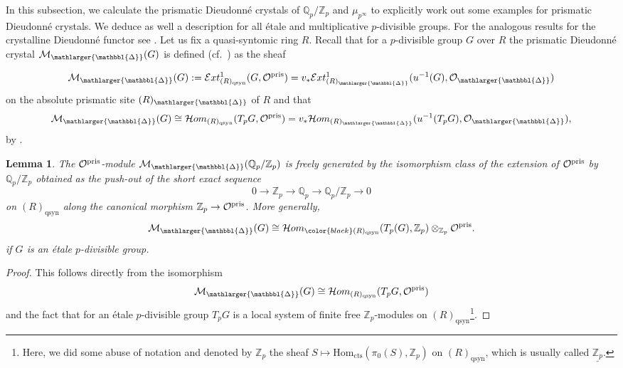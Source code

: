 \documentclass{amsart}
\newcommand{\prism}{{\mathlarger{\mathbbl{\Delta}}}}
\theoremstyle{plain}
\newtheorem{lemma}[theorem]{Lemma}
\theoremstyle{definition}
\newcommand{\Q}{\mathbb{Q}}
\newcommand{\Z}{\mathbb{Z}}
\newcommand{\red}[1]{{\color{black} #1}}
\begin{document}
In this subsection, we calculate the prismatic Dieudonn\'e crystals of $\Q_p/\Z_p$ and $\mu_{p^\infty}$ to explicitly work out some examples for prismatic Dieudonn\'e crystals. We deduce as well a description for all \'etale and multiplicative $p$-divisible groups.
For the analogous results for the crystalline Dieudonn\'e functor see \cite[2.2]{berthelot_messing_theorie_de_dieudonne_cristalline_III}.
Let us fix a quasi-syntomic ring $R$.
Recall that for a $p$-divisible group $G$ over $R$ the prismatic Dieudonn\'e crystal $\mathcal{M}_\prism(G)$ is defined (cf.\ ) as the sheaf

$$
\mathcal{M}_{\prism}(G):=\mathcal{E}xt_{(R)_{\mathrm{qsyn}}}^1(G,\mathcal{O}^{\rm pris}) = v_*\mathcal{E}xt_{(R)_{\prism}}^{1}(u^{-1}(G),\mathcal{O}_\prism)
$$
on the absolute prismatic site $(R)_\prism$ of $R$ and that
$$
\mathcal{M}_\prism(G)\cong \mathcal{H}om_{(R)_{\mathrm{qsyn}}}(T_pG, \mathcal{O}^{\rm pris})= v_*\mathcal{H}om_{(R)_{\prism}}(u^{-1}(T_pG),\mathcal{O}_\prism),
$$
by .

\begin{lemma}
  \label{sec:prism-dieud-modul-lemma-prismatic-dieudonne-module-for-etale-p-divisible-groups} The $\mathcal{O}^{\rm pris}$-module $\mathcal{M}_\prism(\Q_p/\Z_p)$ is \red{freely generated by the isomorphism class of the extension of $\mathcal{O}^{\rm pris}$ by $\Q_p/\Z_p$ obtained as} the push-out of the short exact sequence
  $$
  0\to \Z_p\to \Q_p\to \Q_p/\Z_p\to 0
  $$
  on $(R)_{\mathrm{qsyn}}$ along the canonical morphism $\Z_p\to \mathcal{O}^{\rm pris}$. More generally,
  $$
  \mathcal{M}_\prism(G)\cong \mathcal{H}om_{\red{(R)_{\rm qsyn}}}(T_p(G),\Z_p)\otimes_{\Z_p} \mathcal{O}^{\rm pris}.
  $$
  if $G$ is an \'etale $p$-divisible group.
\end{lemma}
\begin{proof}
  This follows directly from the isomorphism
  $$
  \mathcal{M}_\prism(G)\cong \mathcal{H}om_{(R)_{\mathrm{qsyn}}}(T_pG,\mathcal{O}^{\rm pris})
  $$
  and the fact that for an \'etale $p$-divisible group $T_pG$ is a local system of finite free $\Z_p$-modules on $(R)_{\mathrm{qsyn}}$\footnote{Here, we did some abuse of notation and denoted by $\Z_p$ the sheaf $S\mapsto \mathrm{Hom}_{\mathrm{cts}}(\pi_0(S),\Z_p)$ on $(R)_{\mathrm{qsyn}}$, which is usually called $\underline{\Z_p}$.}.
\end{proof}
\end{document}
